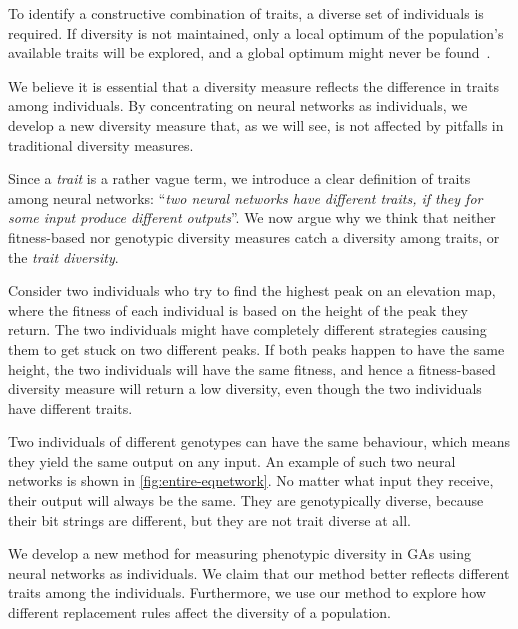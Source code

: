 To identify a constructive combination of traits, a diverse set of individuals is required. If diversity is not maintained, only a local optimum of the population's available traits will be explored, and a global optimum might never be found~\cite{ursem2002diversity}.

We believe it is essential that a diversity measure reflects the difference in traits among individuals. By concentrating on neural networks as individuals, we develop a new diversity measure that, as we will see, is not affected by pitfalls in traditional diversity measures.

Since a \emph{trait} is a rather vague term, we introduce a clear definition of traits among neural networks: ``\emph{two neural networks have different traits, if they for some input produce different outputs}''. We now argue why we think that neither fitness-based nor genotypic diversity measures catch a diversity among traits, or the \emph{trait diversity}.

Consider two individuals who try to find the highest peak on an elevation map, where the fitness of each individual is based on the height of the peak they return. The two individuals might have completely different strategies causing them to get stuck on two different peaks. If both peaks happen to have the same height, the two individuals will have the same fitness, and hence a fitness-based diversity measure will return a low diversity, even though the two individuals have different traits.

Two individuals of different genotypes can have the same behaviour, which means they yield the same output on any input. An example of such two neural networks is shown in \cref{fig:entire-eqnetwork}. No matter what input they receive, their output will always be the same. They are genotypically diverse, because their bit strings are different, but they are not trait diverse at all.
%

%
We develop a new method for measuring phenotypic diversity in GAs using neural networks as individuals. We claim that our method better reflects different traits among the individuals. Furthermore, we use our method to explore how different replacement rules affect the diversity of a population.


